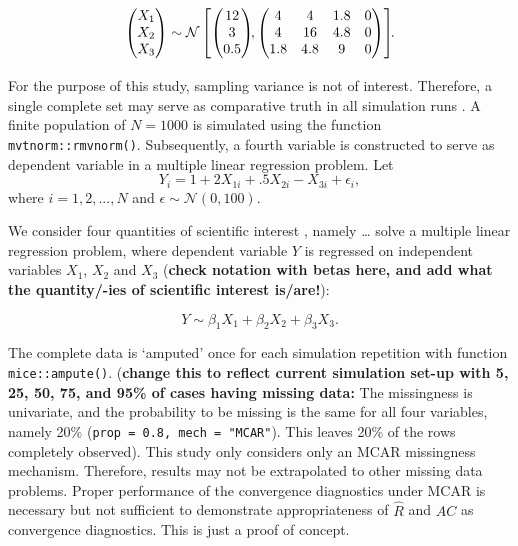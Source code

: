 \documentclass[Royal,times,sageh]{sagej}
\begin{document}
\begin{align*}
\begin{pmatrix}X_1\\
X_2\\
X_3
\end{pmatrix} \sim  \mathcal{N}
\begin{bmatrix}
\begin{pmatrix}
12\\
3\\
0.5
\end{pmatrix}\!\!,
\begin{pmatrix}
4 & 4 & 1.8 & 0\\
4 & 16 & 4.8 & 0\\
1.8 & 4.8 & 9 & 0
\end{pmatrix}
\end{bmatrix}\!\!\text{.}\\[2\jot]
\end{align*} For the purpose of this study, sampling variance is not of
interest. Therefore, a single complete set may serve as comparative
truth in all simulation runs \citep{vinknd}. A finite population of
\(N=1000\) is simulated using the function \texttt{mvtnorm::rmvnorm()}.
Subsequently, a fourth variable is constructed to serve as dependent
variable in a multiple linear regression problem. Let \[
Y_i =  1 + 2X_{1i} + .5X_{2i} - X_{3i} + \epsilon_i ,
\] where \(i = 1, 2, ..., N\) and \(\epsilon \sim \mathcal{N}(0, 100)\).

We consider four quantities of scientific interest \citep[`conceptual
estimands';][]{morr19}, namely \ldots{} solve a multiple linear
regression problem, where dependent variable \(Y\) is regressed on
independent variables \(X_1\), \(X_2\) and \(X_3\) (\textbf{check
notation with betas here, and add what the quantity/-ies of scientific
interest is/are!}):

\[Y \sim \beta_1 X_1 + \beta_2 X_2 + \beta_3 X_3.\]

The complete data is `amputed' once for each simulation repetition with
function \texttt{mice::ampute()}. (\textbf{change this to reflect
current simulation set-up with 5, 25, 50, 75, and 95\% of cases having
missing data:} The missingness is univariate, and the probability to be
missing is the same for all four variables, namely 20\%
(\texttt{prop\ =\ 0.8,\ mech\ =\ "MCAR"}). This leaves 20\% of the rows
completely observed). This study only considers only an MCAR missingness
mechanism. Therefore, results may not be extrapolated to other missing
data problems. Proper performance of the convergence diagnostics under
MCAR is necessary but not sufficient to demonstrate appropriateness of
\(\widehat{R}\) and \(AC\) as convergence diagnostics. This is just a
proof of concept.
\end{document}
